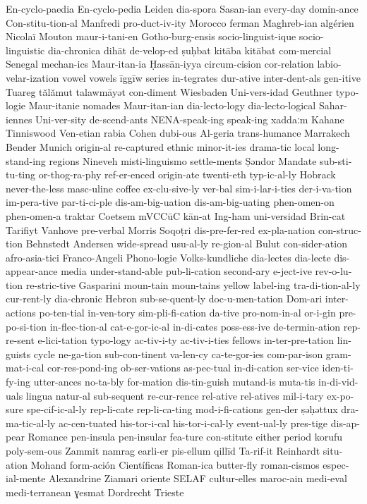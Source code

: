 {En-cyclo-paedia
En-cyclo-pedia
Leiden
dia-spora
Sasan-ian
every-day
domin-ance
Con-stitu-tion-al
Manfredi
pro-duct-iv-ity
Morocco
ferman
Maghreb-ian
algérien
Nicolaï
Mouton
maur-i-tani-en
Gotho-burg-ensis
socio-linguist-ique
socio-linguistic
dia-chronica
dihāt
de-velop-ed
ṣuḥbat
kitāba
kitābat
com-mercial
Senegal
mechan-ics
Maur-itan-ia
Ḥassān-iyya
circum-cision
cor-relation
labio-velar-ization
vowel
vowels
īggīw
series
in-tegrates
dur-ative
inter-dent-als
gen-itive
Tuareg
tălămut
talawmāyət
con-diment
Wiesbaden
Uni-vers-idad
Geuthner
typo-logie
Maur-itanie
nomades
Maur-itan-ian
dia-lecto-logy
dia-lecto-logical
Sahar-iennes
Uni-ver-sity
de-scend-ants
NENA-speak-ing
speak-ing
xaddaːm
Kahane
Tinniswood
Ven-etian
rabia
Cohen
dubi-ous
Al-geria
trans-humance
Marrakech
Bender
Munich
origin-al
re-captured
ethnic
minor-it-ies
drama-tic
local
long-stand-ing
regions
Nineveh
misti-linguismo
settle-ments
Ṣəndor
Mandate
sub-sti-tu-ting
or-thog-ra-phy
ref-er-enced
origin-ate
twenti-eth
typ-ic-al-ly
Hobrack
never-the-less
masc-uline
coffee
ex-clu-sive-ly
ver-bal
sim-i-lar-i-ties
der-i-va-tion
im-pera-tive
par-ti-ci-ple
dis-am-big-uation
dis-am-big-uating
phen-omen-on
phen-omen-a
traktar
Coetsem
mVCCūC
kān-at
Ing-ham
uni-versidad
Brin-cat
Tarifiyt
Vanhove
pre-verbal
Morris
Soqoṭri
dis-pre-fer-red
ex-pla-nation
con-struc-tion
Behnstedt
Andersen
wide-spread
usu-al-ly
re-gion-al
Bulut
con-sider-ation
afro-asia-tici
Franco-Angeli
Phono-logie
Volks-kundliche
dia-lectes
dia-lecte
dis-appear-ance
media
under-stand-able
pub-li-cation
second-ary
e-ject-ive
rev-o-lu-tion
re-stric-tive
Gasparini
moun-tain
moun-tains
yellow
label-ing
tra-di-tion-al-ly
cur-rent-ly
dia-chronic
Hebron
sub-se-quent-ly
doc-u-men-tation
Dom-ari
inter-actions
po-ten-tial
in-ven-tory
sim-pli-fi-cation
da-tive
pro-nom-in-al
or-i-gin
pre-po-si-tion
in-flec-tion-al
cat-e-gor-ic-al
in-di-cates
poss-ess-ive
de-termin-ation
rep-re-sent
e-lici-tation
typo-logy
ac-tiv-i-ty
ac-tiv-i-ties
fellows
in-ter-pre-tation
lin-guists
cycle
ne-ga-tion
sub-con-tinent
va-len-cy
ca-te-gor-ies
com-par-ison
gram-mat-i-cal
cor-res-pond-ing
ob-ser-vations
as-pec-tual
in-di-cation
ser-vice
iden-ti-fy-ing
utter-ances
no-ta-bly
for-mation
dis-tin-guish
mutand-is
muta-tis
in-di-vid-uals
lingua
natur-al
sub-sequent
re-cur-rence
rel-ative
rel-atives
mil-i-tary
ex-po-sure
spe-cif-ic-al-ly
rep-li-cate
rep-li-ca-ting
mod-i-fi-cations
gen-der
ṣəḥəttux
dra-ma-tic-al-ly
ac-cen-tuated
his-tor-i-cal
his-tor-i-cal-ly
event-ual-ly
pres-tige
dis-ap-pear
Romance
pen-insula
pen-insular
fea-ture
con-stitute
either
period
korufu
poly-sem-ous
Zammit
namrag
earli-er
pis-ellum
qillīd
Ta-rif-it
Reinhardt
situ-ation
Mohand
form-ación
Científicas
Roman-ica
butter-fly
roman-cismos
espec-ial-mente
Alexandrine
Ziamari
oriente
SELAF
cultur-elles
maroc-ain
medi-eval
medi-terranean
ɣesmat
Dordrecht
Trieste
}